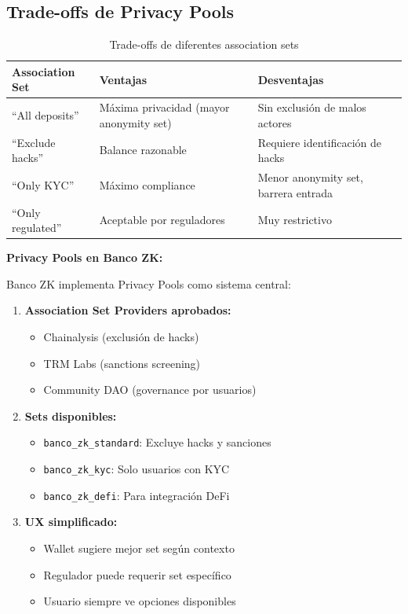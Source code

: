 \documentclass[11pt,a4paper,twoside]{book}
\theoremstyle{definition}
\theoremstyle{remark}
\begin{document}
\subsection{Trade-offs de Privacy Pools}

\begin{table}[htbp]
\centering
\small
\begin{tabular}{lp{4cm}p{4cm}}
\toprule
\textbf{Association Set} & \textbf{Ventajas} & \textbf{Desventajas} \\
\midrule
``All deposits'' & Máxima privacidad (mayor anonymity set) & Sin exclusión de malos actores \\
``Exclude hacks'' & Balance razonable & Requiere identificación de hacks \\
``Only KYC'' & Máximo compliance & Menor anonymity set, barrera entrada \\
``Only regulated'' & Aceptable por reguladores & Muy restrictivo \\
\bottomrule
\end{tabular}
\caption{Trade-offs de diferentes association sets}
\end{table}

\begin{bancozk}
\textbf{Privacy Pools en Banco ZK:}

Banco ZK implementa Privacy Pools como sistema central:

\begin{enumerate}
    \item \textbf{Association Set Providers aprobados:}
    \begin{itemize}
        \item Chainalysis (exclusión de hacks)
        \item TRM Labs (sanctions screening)
        \item Community DAO (governance por usuarios)
    \end{itemize}
    
    \item \textbf{Sets disponibles:}
    \begin{itemize}
        \item \texttt{banco\_zk\_standard}: Excluye hacks y sanciones
        \item \texttt{banco\_zk\_kyc}: Solo usuarios con KYC
        \item \texttt{banco\_zk\_defi}: Para integración DeFi
    \end{itemize}
    
    \item \textbf{UX simplificado:}
    \begin{itemize}
        \item Wallet sugiere mejor set según contexto
        \item Regulador puede requerir set específico
        \item Usuario siempre ve opciones disponibles
    \end{itemize}
\end{enumerate}
\end{bancozk}
\end{document}
